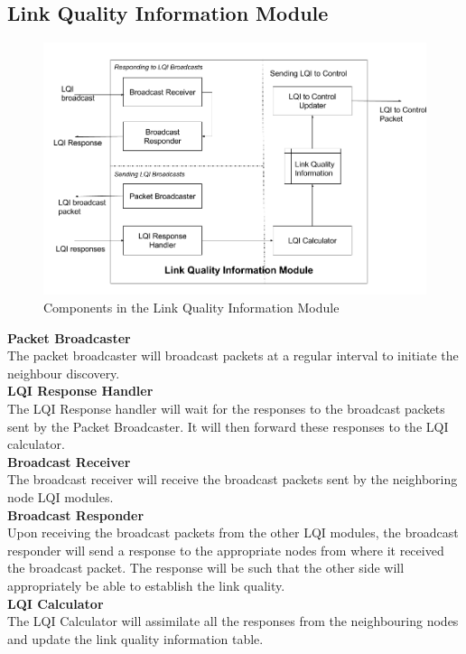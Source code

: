 \documentclass{article}
\begin{document}
\subsection{Link Quality Information Module}
\begin{figure}[H]
\caption{Components in the Link Quality Information Module}
\centering
\includegraphics[width=\textwidth]{lqi}
\end{figure}
\noindent \textbf{Packet Broadcaster} \\
The packet broadcaster will broadcast packets at a regular interval to initiate the neighbour discovery. \\

\noindent \textbf{LQI Response Handler} \\
The LQI Response handler will wait for the responses to the broadcast packets sent by the Packet Broadcaster. It will
then forward these responses to the LQI calculator. \\

\noindent \textbf{Broadcast Receiver} \\
The broadcast receiver will receive the broadcast packets sent by the neighboring node LQI modules. \\

\noindent \textbf{Broadcast Responder} \\
Upon receiving the broadcast packets from the other LQI modules, the broadcast responder will send a response to the
appropriate nodes from where it received the broadcast packet. The response will be such that the other side will
appropriately be able to establish the link quality.\\

\noindent \textbf{LQI Calculator} \\
The LQI Calculator will assimilate all the responses from the neighbouring nodes and update the link quality information
table.\\
\end{document}
